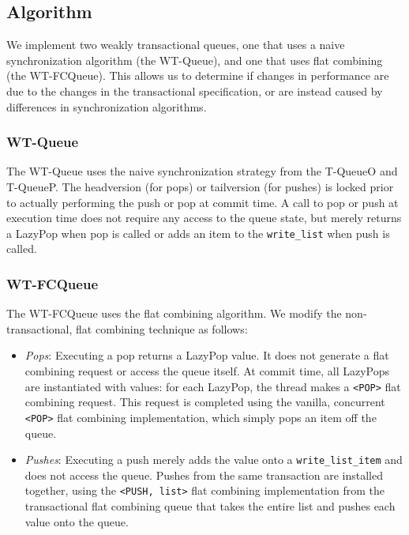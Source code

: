 \subsection{Algorithm}

We implement two weakly transactional queues, one that uses a naive synchronization algorithm (the WT-Queue), and one that uses flat combining (the WT-FCQueue). This allows us to determine if changes in performance are due to the changes in the transactional specification, or are instead caused by differences in synchronization algorithms.

\subsubsection{WT-Queue}
The WT-Queue uses the naive synchronization strategy from the T-QueueO and T-QueueP. The headversion (for pops) or tailversion (for pushes) is locked prior to actually performing the push or pop at commit time. A call to pop or push at execution time does not require any access to the queue state, but merely returns a LazyPop when pop is called or adds an item to the \texttt{write\_list} when push is called.

\subsubsection{WT-FCQueue}
The WT-FCQueue uses the flat combining algorithm. We modify the non-transactional, flat combining technique as follows:
\begin{itemize}
    \item \emph{Pops}: 
    Executing a pop returns a LazyPop value. It does not generate a flat combining request or access the queue itself. At commit time, all LazyPops are instantiated with values: for each LazyPop, the thread makes a \texttt{<POP>} flat combining request. This request is completed using the vanilla, concurrent \texttt{<POP>} flat combining implementation, which simply pops an item off the queue.

    \item \emph{Pushes}: 
    Executing a push merely adds the value onto a \texttt{write\_list\_item} and does not access the queue. Pushes from the same transaction are installed together, using the \texttt{<PUSH, list>} flat combining implementation from the transactional flat combining queue that takes the entire list and pushes each value onto the queue.
\end{itemize}

